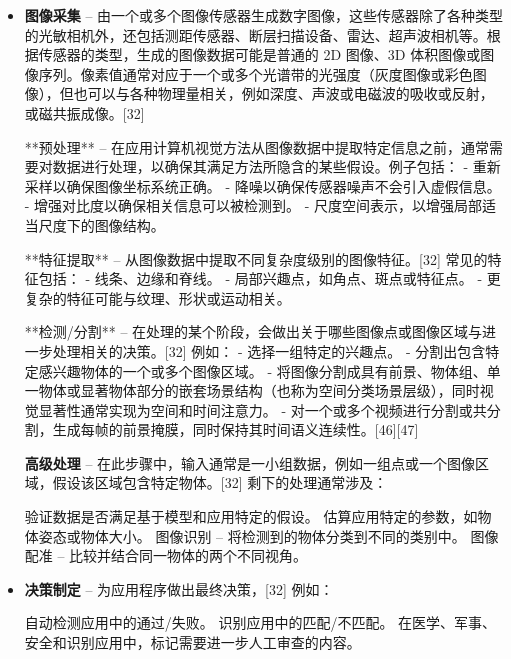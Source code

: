 \begin{itemize}
\item \textbf{图像采集} – 由一个或多个图像传感器生成数字图像，这些传感器除了各种类型的光敏相机外，还包括测距传感器、断层扫描设备、雷达、超声波相机等。根据传感器的类型，生成的图像数据可能是普通的 2D 图像、3D 体积图像或图像序列。像素值通常对应于一个或多个光谱带的光强度（灰度图像或彩色图像），但也可以与各种物理量相关，例如深度、声波或电磁波的吸收或反射，或磁共振成像。[32]  

**预处理** – 在应用计算机视觉方法从图像数据中提取特定信息之前，通常需要对数据进行处理，以确保其满足方法所隐含的某些假设。例子包括：  
- 重新采样以确保图像坐标系统正确。  
- 降噪以确保传感器噪声不会引入虚假信息。  
- 增强对比度以确保相关信息可以被检测到。  
- 尺度空间表示，以增强局部适当尺度下的图像结构。  

**特征提取** – 从图像数据中提取不同复杂度级别的图像特征。[32] 常见的特征包括：  
- 线条、边缘和脊线。  
- 局部兴趣点，如角点、斑点或特征点。  
- 更复杂的特征可能与纹理、形状或运动相关。  

**检测/分割** – 在处理的某个阶段，会做出关于哪些图像点或图像区域与进一步处理相关的决策。[32] 例如：  
- 选择一组特定的兴趣点。  
- 分割出包含特定感兴趣物体的一个或多个图像区域。  
- 将图像分割成具有前景、物体组、单一物体或显著物体部分的嵌套场景结构（也称为空间分类场景层级），同时视觉显著性通常实现为空间和时间注意力。  
- 对一个或多个视频进行分割或共分割，生成每帧的前景掩膜，同时保持其时间语义连续性。[46][47]  


\textbf{高级处理} – 在此步骤中，输入通常是一小组数据，例如一组点或一个图像区域，假设该区域包含特定物体。[32] 剩下的处理通常涉及：  

验证数据是否满足基于模型和应用特定的假设。  
估算应用特定的参数，如物体姿态或物体大小。  
图像识别 – 将检测到的物体分类到不同的类别中。  
图像配准 – 比较并结合同一物体的两个不同视角。
 


\item \textbf{决策制定} – 为应用程序做出最终决策，[32] 例如：  

自动检测应用中的通过/失败。  
识别应用中的匹配/不匹配。  
在医学、军事、安全和识别应用中，标记需要进一步人工审查的内容。
\end{itemize}
